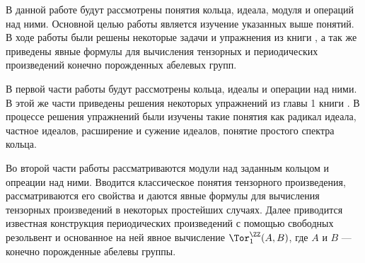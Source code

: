 В данной работе будут рассмотрены понятия кольца, идеала, модуля и операций над ними. 
Основной целью работы является изучение указанных выше понятий. 
В ходе работы были решены некоторые задачи и упражнения из книги \cite{A-M}, а так же приведены 
явные формулы для вычисления тензорных и периодических произведений конечно порожденных абелевых групп. 

В первой части работы будут рассмотрены кольца, идеалы и операции над ними. В этой же части приведены решения некоторых упражнений из главы 1 книги \cite{A-M}. В процессе 
решения упражнений были изучены такие понятия как радикал идеала, частное идеалов, расширение и сужение идеалов, понятие простого спектра кольца.

Во второй части работы рассматриваются модули над заданным кольцом и опреации над ними. 
Вводится классическое понятия тензорного произведения, рассматриваются его свойства и даются 
явные формулы для вычисления тензорных произведений в некоторых простейших случаях. 
Далее приводится известная конструкция периодических произведений с помощью свободных резольвент и основанное на ней явное вычисление $\Tor_1^\ZZ(A, B)$, где $A$ и $B$ --- конечно порожденные абелевы группы.

